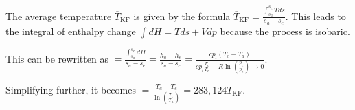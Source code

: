 The average temperature \( \overline{T}_{\text{KF}} \) is given by the formula \( \overline{T}_{\text{KF}} = \frac{\int_{s_a}^{s_e} T ds}{s_a - s_e} \). This leads to the integral of enthalpy change \( \int dH = T ds + V dp \) because the process is isobaric.

This can be rewritten as \( = \frac{\int_{s_a}^{s_e} dH}{s_a - s_e} = \frac{h_a - h_e}{s_a - s_e} = \frac{cp_l (T_e - T_a)}{cp_l \frac{T_e}{T_e} - R \ln \left( \frac{p_e}{p_e} \right) \rightarrow 0} \).

Simplifying further, it becomes \( = \frac{T_a - T_e}{\ln \left( \frac{T_e}{T_a} \right)} = 283,124 \overline{T}_{\text{KF}} \).